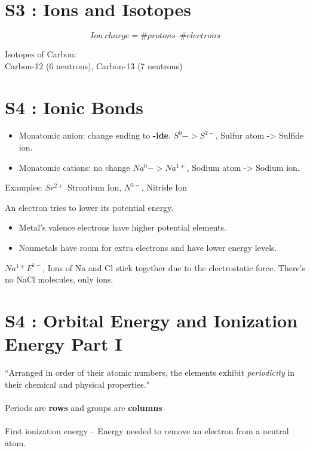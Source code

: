 \documentclass[12pt]{article}
\begin{document}
\section{S3 : Ions and Isotopes}

\begin{equation}
Ion\ charge =\#protons –\#electrons
\end{equation}

Isotopes of Carbon:\\
Carbon-12 (6 neutrons), Carbon-13 (7 neutrons)

\section{S4 : Ionic Bonds}

\begin{itemize}
\item Monatomic anion: change ending to \textbf{-ide}. $S^0->S^{2-}$, Sulfur atom -> Sulfide ion. 
\item Monatomic cations: no change $Na^0->Na^{1+}$, Sodium atom -> Sodium ion.
\end{itemize}

Examples: $Sr^{2+}$ Strontium Ion, $N^{3-}$, Nitride Ion

An electron tries to lower its potential energy.
\begin{itemize}
\item Metal's valence electrons have higher potential elements. 
\item Nonmetals have room for extra electrons and have lower energy levels. 
\end{itemize}

$Na^{1+}F^{1-}$, Ions of Na and Cl stick together due to the electrostatic force. There's no NaCl molecules, only ions.

\section{S4 : Orbital Energy and Ionization Energy Part I}

“Arranged in order of their atomic numbers,
 the elements exhibit \emph{periodicity} in their
 chemical and physical properties."\\
 \\
Periods are \textbf{rows} and groups are \textbf{columns}\\
\\
First ionization energy -- Energy needed to remove an electron from a neutral atom.
\end{document}
